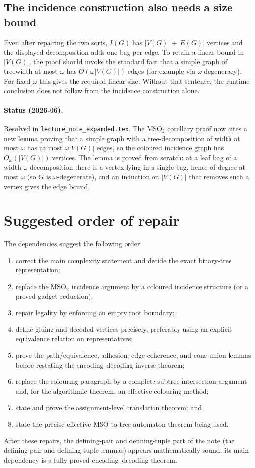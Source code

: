 \documentclass[11pt]{article}
\newcommand{\MSO}{\ensuremath{\mathrm{MSO}}}
\newcommand{\MSOtwo}{\ensuremath{\mathrm{MSO}_2}}
\begin{document}
\subsection{The incidence construction also needs a size bound}

Even after repairing the two sorts, \(I(G)\) has \(|V(G)|+|E(G)|\) vertices and
the displayed decomposition adds one bag per edge.  To retain a linear bound in
\(|V(G)|\), the proof should invoke the standard fact that a simple graph of
treewidth at most \(\omega\) has \(O(\omega|V(G)|)\) edges (for example via
\(\omega\)-degeneracy).  For fixed \(\omega\) this gives the required linear
size.  Without that sentence, the runtime conclusion does not follow from the
incidence construction alone.

\paragraph{Status (2026-06).} Resolved in \texttt{lecture\_note\_expanded.tex}.
The \MSOtwo{} corollary proof now cites a new lemma proving that a simple graph
with a tree-decomposition of width at most \(\omega\) has at most
\(\omega|V(G)|\) edges, so the coloured incidence graph has \(O_\omega(|V(G)|)\)
vertices.  The lemma is proved from scratch: at a leaf bag of a width-\(\omega\)
decomposition there is a vertex lying in a single bag, hence of degree at most
\(\omega\) (so \(G\) is \(\omega\)-degenerate), and an induction on \(|V(G)|\)
that removes such a vertex gives the edge bound.

\section{Suggested order of repair}

The dependencies suggest the following order:
\begin{enumerate}[leftmargin=*]
  \item correct the main complexity statement and decide the exact binary-tree
    representation;
  \item replace the \MSOtwo{} incidence argument by a coloured incidence
    structure (or a proved gadget reduction);
  \item repair legality by enforcing an empty root boundary;
  \item define gluing and decoded vertices precisely, preferably using an
    explicit equivalence relation on representatives;
  \item prove the path/equivalence, adhesion, edge-coherence, and cone-union
    lemmas before restating the encoding--decoding inverse theorem;
  \item replace the colouring paragraph by a complete subtree-intersection
    argument and, for the algorithmic theorem, an effective colouring method;
  \item state and prove the assignment-level translation theorem; and
  \item state the precise effective \MSO{}-to-tree-automaton theorem being used.
\end{enumerate}

After these repairs, the defining-pair and defining-tuple part of the note
(the defining-pair and defining-tuple lemmas) appears mathematically sound; its main dependency is a
fully proved encoding--decoding theorem.
\end{document}
